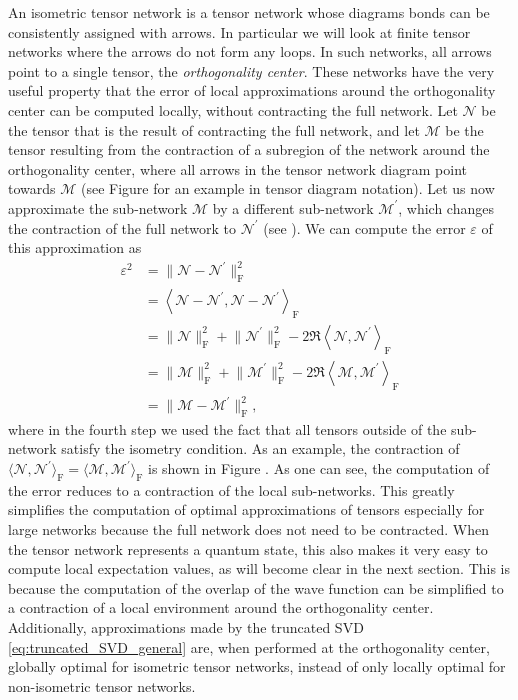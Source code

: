 An isometric tensor network is a tensor network whose diagrams bonds can be consistently assigned with arrows. In particular we will look at finite tensor networks where the arrows do not form any loops. In such networks, all arrows point to a single tensor, the \textit{orthogonality center}. These networks have the very useful property that the error of local approximations around the orthogonality center can be computed locally, without contracting the full network. Let $\mathcal{N}$ be the tensor that is the result of contracting the full network, and let $\mathcal{M}$ be the tensor resulting from the contraction of a subregion of the network around the orthogonality center, where all arrows in the tensor network diagram point towards $\mathcal{M}$ (see Figure  for an example in tensor diagram notation). Let us now approximate the sub-network $\mathcal{M}$ by a different sub-network $\mathcal{M}^\prime$, which changes the contraction of the full network to $\mathcal{N}^\prime$ (see ). We can compute the error $\varepsilon$ of this approximation as
\begin{equation}
\begin{split}
	\varepsilon^2 &= \lVert\mathcal{N}-\mathcal{N}^\prime\rVert^2_\text{F} \\
	&=
	\left\langle\mathcal{N}-\mathcal{N}^\prime, \mathcal{N}-\mathcal{N}^\prime\right\rangle_\text{F} \\
	&= \lVert\mathcal{N}\rVert_\text{F}^2 + \lVert\mathcal{N}^\prime\rVert_\text{F}^2 - 2\Re\left\langle\mathcal{N},\mathcal{N}^\prime\right\rangle_\text{F} \\
	&= \lVert\mathcal{M}\rVert_\text{F}^2 + \lVert\mathcal{M}^\prime\rVert_\text{F}^2 - 2\Re\left\langle\mathcal{M},\mathcal{M}^\prime\right\rangle_\text{F} \\
	&= \lVert\mathcal{M}-\mathcal{M}^\prime\rVert^2_\text{F},
\end{split}
\end{equation}
where in the fourth step we used the fact that all tensors outside of the sub-network satisfy the isometry condition. As an example, the contraction of $\langle\mathcal{N},\mathcal{N}^\prime\rangle_\text{F} = \langle\mathcal{M},\mathcal{M}^\prime\rangle_\text{F}$ is shown in Figure . As one can see, the computation of the error reduces to a contraction of the local sub-networks. This greatly simplifies the computation of optimal approximations of tensors especially for large networks because the full network does not need to be contracted. When the tensor network represents a quantum state, this also makes it very easy to compute local expectation values, as will become clear in the next section. This is because the computation of the overlap of the wave function can be simplified to a contraction of a local environment around the orthogonality center. Additionally, approximations made by the truncated SVD \ref{eq:truncated_SVD_general} are, when performed at the orthogonality center, globally optimal for isometric tensor networks, instead of only locally optimal for non-isometric tensor networks.
